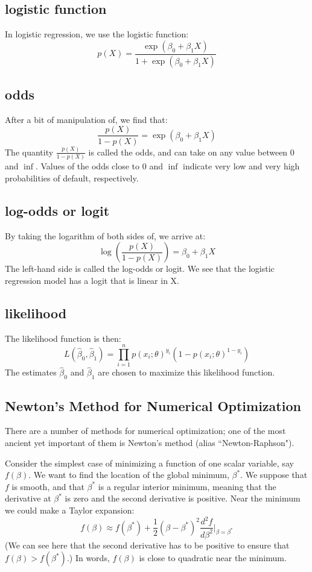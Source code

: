 \documentclass{article}
\begin{document}
\subsection{logistic function}
In logistic regression, we use the logistic function:
\[
p(X) = \frac{\exp ({\beta_0 + \beta_1 X})}{1 + \exp ({\beta_0 + \beta_1 X})}
\]

\subsection{odds}
After a bit of manipulation of, we find that:
\[
\frac{p(X)}{1 - p(X)} = \exp ({\beta_0 + \beta_1 X})
\]
The quantity $\frac{p(X)}{1 - p(X)}$ is called the odds, and can take on any value
between $0$ and $\inf$. Values of the odds close to $0$ and $\inf$ indicate very low
and very high probabilities of default, respectively. 

\subsection{log-odds or logit}
By taking the logarithm of both sides of, we arrive at:
\[
\log \left( \frac{p(X)}{1 - p(X)} \right) = {\beta_0 + \beta_1 X}
\]
The left-hand side is called the log-odds or logit. We see that the logistic regression model has a logit that is linear in X.

\subsection{likelihood}
The likelihood function is then:
\[
L( {\hat{\beta}_0, \hat{\beta}_1} ) = \prod_{i=1}^{n} p(x_i;\theta)^{y_i} (1-p(x_i;\theta)^{1-y_i}) 
\]
The estimates $\hat{\beta}_0$ and $\hat{\beta}_1$ are chosen to maximize this likelihood function.

\subsection{Newton's Method for Numerical Optimization}
There are a number of methods for numerical optimization; one of the most ancient yet important of them is Newton's method (alias ``Newton-Raphson").

Consider the simplest case of minimizing a function of one scalar variable, say $f(\beta)$. We want to find the location of the global minimum, $\beta^{\ast}$. We suppose that $f$ is smooth, and that $\beta^{\ast}$ is a regular interior minimum, meaning that the derivative at $\beta^{\ast}$ is zero and the second derivative is positive. Near the minimum we could make a Taylor expansion:
\[
f(\beta) \approx f(\beta^{\ast}) + \frac{1}{2} (\beta - \beta^{\ast})^2 \frac{d^2f}{d\beta^2} \Bigr|_{\beta = \beta^{\ast}}
\]
(We can see here that the second derivative has to be positive to ensure that $f(\beta)>f(\beta^{\ast})$.) In words, $f(\beta)$ is close to quadratic near the minimum.
\end{document}
